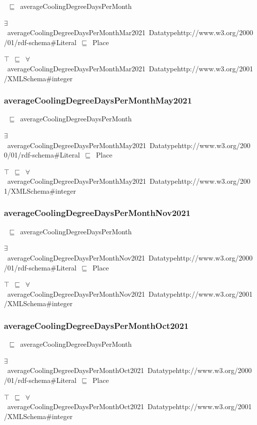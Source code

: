 \documentclass{article}
\begin{document}
~\ensuremath{\sqsubseteq}~averageCoolingDegreeDaysPerMonth

\ensuremath{\exists}~averageCoolingDegreeDaysPerMonthMar2021~Datatypehttp://www.w3.org/2000/01/rdf-schema#Literal~\ensuremath{\sqsubseteq}~Place

\ensuremath{\top}~\ensuremath{\sqsubseteq}~\ensuremath{\forall}~averageCoolingDegreeDaysPerMonthMar2021~Datatypehttp://www.w3.org/2001/XMLSchema#integer

\subsubsection*{averageCoolingDegreeDaysPerMonthMay2021}

~\ensuremath{\sqsubseteq}~averageCoolingDegreeDaysPerMonth

\ensuremath{\exists}~averageCoolingDegreeDaysPerMonthMay2021~Datatypehttp://www.w3.org/2000/01/rdf-schema#Literal~\ensuremath{\sqsubseteq}~Place

\ensuremath{\top}~\ensuremath{\sqsubseteq}~\ensuremath{\forall}~averageCoolingDegreeDaysPerMonthMay2021~Datatypehttp://www.w3.org/2001/XMLSchema#integer

\subsubsection*{averageCoolingDegreeDaysPerMonthNov2021}

~\ensuremath{\sqsubseteq}~averageCoolingDegreeDaysPerMonth

\ensuremath{\exists}~averageCoolingDegreeDaysPerMonthNov2021~Datatypehttp://www.w3.org/2000/01/rdf-schema#Literal~\ensuremath{\sqsubseteq}~Place

\ensuremath{\top}~\ensuremath{\sqsubseteq}~\ensuremath{\forall}~averageCoolingDegreeDaysPerMonthNov2021~Datatypehttp://www.w3.org/2001/XMLSchema#integer

\subsubsection*{averageCoolingDegreeDaysPerMonthOct2021}

~\ensuremath{\sqsubseteq}~averageCoolingDegreeDaysPerMonth

\ensuremath{\exists}~averageCoolingDegreeDaysPerMonthOct2021~Datatypehttp://www.w3.org/2000/01/rdf-schema#Literal~\ensuremath{\sqsubseteq}~Place

\ensuremath{\top}~\ensuremath{\sqsubseteq}~\ensuremath{\forall}~averageCoolingDegreeDaysPerMonthOct2021~Datatypehttp://www.w3.org/2001/XMLSchema#integer
\end{document}
